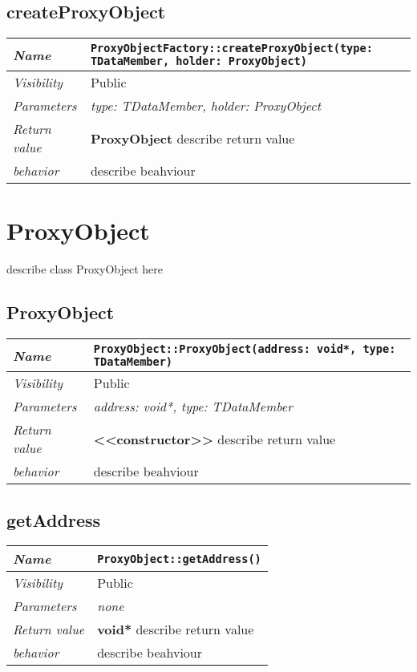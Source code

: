 \section{createProxyObject}
\begin{longtable}{p{3cm} @{\hskip 1cm} p{12cm}}
 \hline
\textit{Name} & \texttt{ProxyObjectFactory::createProxyObject(type: TDataMember, holder: ProxyObject)}\\
\hline
 \textit{Visibility} & Public \\
\hline
\textit{Parameters} & \textit{type: TDataMember, holder: ProxyObject}\\
\hline
\textit{Return value} & \textbf{ ProxyObject} describe return value\\
  \hline
 \textit{behavior} & describe beahviour \\
\hline
\end{longtable} \pagebreak
 \chapter{ProxyObject}
describe class ProxyObject here
\section{ProxyObject}
\begin{longtable}{p{3cm} @{\hskip 1cm} p{12cm}}
 \hline
\textit{Name} & \texttt{ProxyObject::ProxyObject(address: void*, type: TDataMember)}\\
\hline
 \textit{Visibility} & Public \\
\hline
\textit{Parameters} & \textit{address: void*, type: TDataMember}\\
\hline
\textit{Return value} & \textbf{ <<constructor>>} describe return value\\
  \hline
 \textit{behavior} & describe beahviour \\
\hline
\end{longtable} \pagebreak
 \section{getAddress}
\begin{longtable}{p{3cm} @{\hskip 1cm} p{12cm}}
 \hline
\textit{Name} & \texttt{ProxyObject::getAddress()}\\
\hline
 \textit{Visibility} & Public \\
\hline
\textit{Parameters} & \textit{none}\\
\hline
\textit{Return value} & \textbf{ void*} describe return value\\
  \hline
 \textit{behavior} & describe beahviour \\
\hline
\end{longtable} \pagebreak
